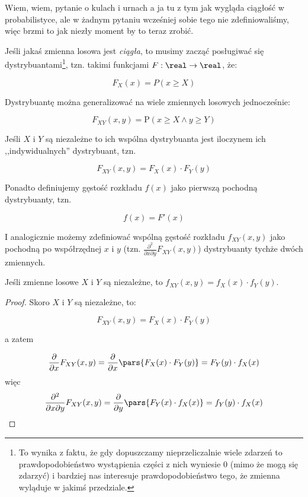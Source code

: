 Wiem, wiem, pytanie o kulach i urnach a ja tu z tym jak wygląda ciągłość w probabilistyce, ale w żadnym pytaniu wcześniej sobie tego nie zdefiniowaliśmy, więc brzmi to jak niezły moment by to teraz zrobić. 

Jeśli jakaś zmienna losowa jest \textit{ciągła}, to musimy zacząć posługiwać się dystrybuantami\footnote{To wynika z faktu, że gdy dopuszczamy nieprzeliczalnie wiele zdarzeń to prawdopodobieństwo wystąpienia części z nich wyniesie 0 (mimo że mogą się zdarzyć) i bardziej nas interesuje prawdopodobieństwo tego, że zmienna wyląduje w jakimś przedziale.}, tzn. takimi funkcjami \( F: \real \rightarrow \real\), że:

\[
    F_X(x) = P(x \geq X)
\]

Dystrybuantę można generalizować na wiele zmiennych losowych jednocześnie:


\[
    F_{XY}(x,y) = \mathrm{P}(x \geq X \land y \geq Y)
\]

Jeśli \(X\) i \(Y\) są niezależne to ich wspólna dystrybuanta jest iloczynem ich ,,indywidualnych'' dystrybuant, tzn. 

\[ 
    F_{XY}(x,y) = F_X(x) \cdot F_Y(y)
\]

Ponadto definiujemy gęstość rozkładu \(f(x)\) jako pierwszą pochodną dystrybuanty, tzn.

\[ 
    f(x) = F'(x)
\]

I analogicznie możemy zdefiniować wspólną gęstość rozkładu \(f_{XY}(x,y)\) jako pochodną po współrzędnej \(x\) i \(y\) (tzn. \( \frac{\partial^2}{\partial x \partial y} F_{XY}(x,y) \)) dystrybuanty tychże dwóch zmiennych. 

\begin{fact}
Jeśli zmienne losowe \(X\) i \(Y\) są niezależne, to \(f_{XY}(x,y) = f_{X}(x) \cdot f_{Y}(y)\). 
\end{fact}

\begin{proof}
    Skoro \(X\) i \(Y\) są niezależne, to:
    
    \[
        F_{XY}(x,y) = F_{X}(x) \cdot F_{Y}(y)
    \]
    
    a zatem 
    
    \[ 
        \frac{\partial}{\partial x} F_{XY}(x,y) = \frac{\partial}{\partial x} \pars{F_{X}(x) \cdot F_{Y}(y)} = F_{Y}(y) \cdot f_{X}(x)
    \]
    więc 
    \[ 
        \frac{\partial^2}{\partial x \partial y} F_{XY}(x,y) = \frac{\partial}{\partial y} \pars{F_{Y}(x) \cdot f_{X}(x)} = f_{Y}(y) \cdot f_{X}(x)
    \]
\end{proof}

